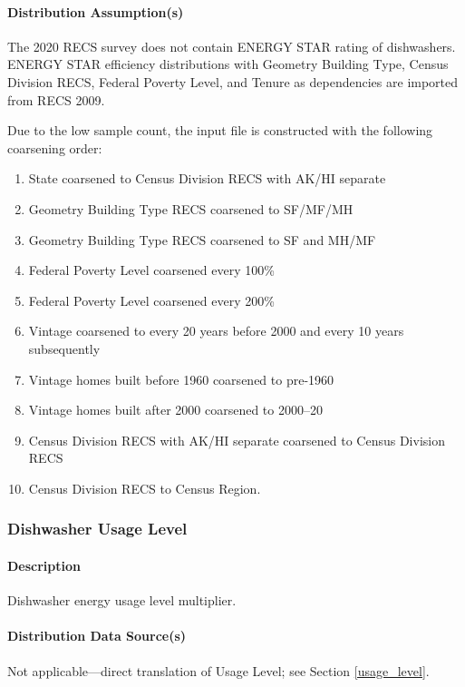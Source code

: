\paragraph{Distribution Assumption(s)}
The 2020 RECS survey does not contain ENERGY STAR rating of dishwashers. ENERGY STAR efficiency distributions with Geometry Building Type, Census Division RECS, Federal Poverty Level, and Tenure as dependencies are imported from RECS 2009.

Due to the low sample count, the input file is constructed with the following coarsening order:
\begin{enumerate}
    \item State coarsened to Census Division RECS with AK/HI separate 
    \item Geometry Building Type RECS coarsened to SF/MF/MH 
    \item  Geometry Building Type RECS coarsened to SF and MH/MF
    \item Federal Poverty Level coarsened every 100\% 
    \item Federal Poverty Level coarsened every 200\% 
    \item Vintage coarsened to every 20 years before 2000 and every 10 years subsequently
    \item  Vintage homes built before 1960 coarsened to pre-1960 
    \item  Vintage homes built after 2000 coarsened to 2000--20 
    \item  Census Division RECS with AK/HI separate coarsened to Census Division RECS 
    \item Census Division RECS to Census Region.
\end{enumerate}

\subsubsection{Dishwasher Usage Level}\label{dishwasher_usage_level}
\paragraph{Description}
Dishwasher energy usage level multiplier.

\paragraph{Distribution Data Source(s)}
Not applicable---direct translation of  Usage Level; see Section \ref{usage_level}.

